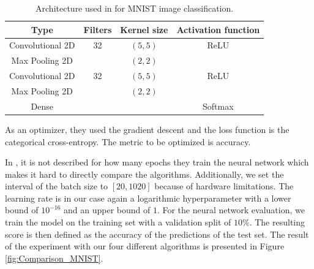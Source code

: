 \begin{table}[H]
	\caption{ Architecture used in \cite{WU201926} for MNIST image classification. }
	\label{tab:architecture_MNIST_comp}
	\centering
	\begin{tabular}{| c c c c |} 
		\hline
		Type & Filters  & Kernel size & Activation function \\ 
		\hline
		Convolutional 2D & 32 & $ (5,5) $ & ReLU \\ 
		Max Pooling 2D &  & $ (2,2) $ &  \\ 
		Convolutional 2D & 32 & $ (5,5) $ & ReLU \\ 
		Max Pooling 2D &  & $ (2,2) $ &  \\ 
		Dense &  &  & Softmax \\ 
		\hline
	\end{tabular}
\end{table}

As an optimizer, they used the gradient descent and the loss function is the categorical cross-entropy. The metric to be optimized is accuracy. \newline 

In \cite{WU201926}, it is not described for how many epochs they train the neural network which makes it hard to directly compare the algorithms. Additionally, we set the interval of the batch size to $ [20, 1020] $ because of hardware limitations. The learning rate is in our case again a logarithmic hyperparameter with a lower bound of $ 10^{-16} $ and an upper bound of $ 1 $. For the neural network evaluation, we train the model on the training set with a validation split of $ 10\% $. The resulting score is then defined as the accuracy of the predictions of the test set. The result of the experiment with our four different algorithms is presented in Figure \ref{fig:Comparison_MNIST}.


